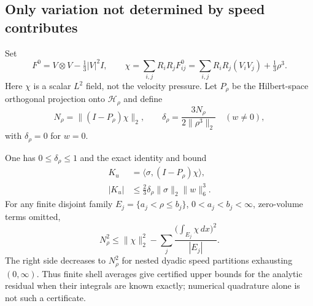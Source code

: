 \subsection{Only variation not determined by speed contributes}

Set
\[
 F^0=V\otimes V-\tfrac13|V|^2I,\qquad
 \chi=\sum_{i,j}R_iR_jF^0_{ij}
      =\sum_{i,j}R_iR_j(V_iV_j)+\tfrac13\rho^3.
\]
Here $\chi$ is a scalar $L^2$ field, not the velocity pressure. Let
$P_\rho$ be the Hilbert-space orthogonal projection onto $\mathcal H_\rho$
and define
\begin{equation}\label{ss:delta}
 N_\rho=\|(I-P_\rho)\chi\|_2,
 \qquad
 \delta_\rho=\frac{3N_\rho}{2\|\rho^3\|_2}
 \quad(w\ne0),
\end{equation}
with $\delta_\rho=0$ for $w=0$.

\begin{proposition}\label{ss:residual}
One has $0\le\delta_\rho\le1$ and the exact identity and bound
\begin{align}
 K_u&=\langle\sigma,(I-P_\rho)\chi\rangle,\label{ss:pairing}\\
 |K_u|&\le\frac23\delta_\rho\|\sigma\|_2\|w\|_6^3.
       \label{ss:effective}
\end{align}
For any finite disjoint family $E_j=\{a_j<\rho\le b_j\}$,
$0<a_j<b_j<\infty$, zero-volume terms omitted,
\begin{equation}\label{ss:finite-shell}
 N_\rho^2\le\|\chi\|_2^2-
     \sum_j\frac{\bigl(\int_{E_j}\chi\,dx\bigr)^2}{|E_j|}.
\end{equation}
The right side decreases to $N_\rho^2$ for nested dyadic speed
partitions exhausting $(0,\infty)$. Thus finite shell averages give
certified upper bounds for the analytic residual when their integrals
are known exactly; numerical quadrature alone is not such a certificate.
\end{proposition}
